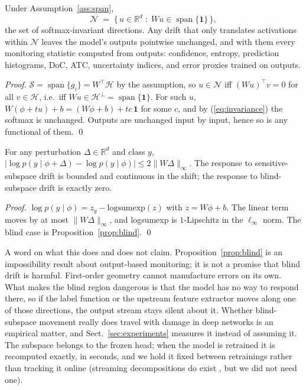 \documentclass[graybox]{SNmult}
\newcommand{\R}{\mathbb{R}}
\newcommand{\act}{\phi}
\DeclareMathOperator{\spn}{span}
\begin{document}
\begin{proposition}
\label{prop:blind}
Under Assumption~\ref{ass:span},
\[
  \mathcal{N} \;=\; \{\, u \in \R^d \;:\; Wu \in \spn\{\mathbf{1}\} \,\},
\]
the set of softmax-invariant directions. Any drift that only translates
activations within $\mathcal{N}$ leaves the model's outputs pointwise
unchanged, and with them every monitoring statistic computed from outputs:
confidence, entropy, prediction histograms, DoC, ATC, uncertainty indices,
and error proxies trained on outputs.
\end{proposition}

\begin{proof}
$\mathcal{S} = \spn\{g_i\} = W^\top\!\mathcal{H}$ by the assumption, so
$u \in \mathcal{N}$ iff $(Wu)^\top v = 0$ for all $v \in \mathcal{H}$, i.e.\
iff $Wu \in \mathcal{H}^\perp = \spn\{\mathbf{1}\}$. For such $u$,
$W(\act + tu) + b = (W\act + b) + tc\,\mathbf{1}$ for some $c$, and by
(\ref{eq:invariance}) the softmax is unchanged. Outputs are unchanged input
by input, hence so is any functional of them. \qed
\end{proof}

\begin{proposition}[Calibrated response in the sensitive subspace]
\label{prop:bounded}
For any perturbation $\Delta \in \R^d$ and class $y$,
$\big|\log p(y \mid \act + \Delta) - \log p(y \mid \act)\big|
\le 2\lVert W\Delta \rVert_\infty$. The response to sensitive-subspace drift
is bounded and continuous in the shift; the response to blind-subspace drift
is exactly zero.
\end{proposition}

\begin{proof}
$\log p(y \mid \act) = z_y - \mathrm{logsumexp}(z)$ with $z = W\act + b$. The
linear term moves by at most $\lVert W\Delta\rVert_\infty$, and logsumexp is
$1$-Lipschitz in the $\ell_\infty$ norm. The blind case is
Proposition~\ref{prop:blind}. \qed
\end{proof}

A word on what this does and does not claim.
Proposition~\ref{prop:blind} is an impossibility result about output-based
monitoring; it is not a promise that blind drift is harmful. First-order
geometry cannot manufacture errors on its own. What makes the blind region
dangerous is that the model has no way to respond there, so if the label
function or the upstream feature extractor moves along one of those
directions, the output stream stays silent about it. Whether blind-subspace
movement really does travel with damage in deep networks is an empirical
matter, and Sect.~\ref{sec:experiments} measures it instead of assuming it.
The subspace belongs to the frozen head; when the model is retrained it is
recomputed exactly, in seconds, and we hold it fixed between retrainings
rather than tracking it online (streaming decompositions do exist
\cite{halko2011structure}, but we did not need one).
\end{document}
